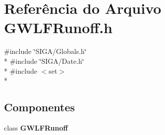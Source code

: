 \section{Referência do Arquivo G\+W\+L\+F\+Runoff.\+h}
\label{_g_w_l_f_runoff_8h}
{\ttfamily \#include \char`\"{}S\+I\+G\+A/\+Globals.\+h\char`\"{}}\\*
{\ttfamily \#include \char`\"{}S\+I\+G\+A/\+Date.\+h\char`\"{}}\\*
{\ttfamily \#include $<$set$>$}\\*
\subsection*{Componentes}
\begin{DoxyCompactItemize}
\item 
class {\bf G\+W\+L\+F\+Runoff}
\end{DoxyCompactItemize}

